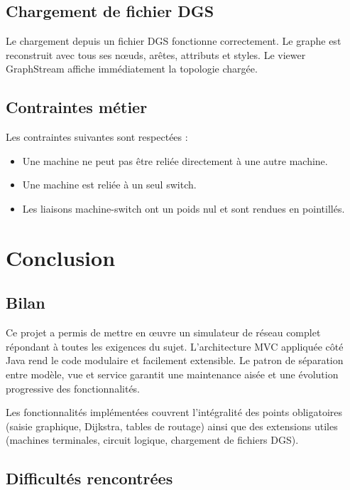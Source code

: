 \documentclass[12pt, a4paper]{article}
\begin{document}
\subsection{Chargement de fichier DGS}

Le chargement depuis un fichier DGS fonctionne correctement. Le graphe est reconstruit avec tous ses nœuds, arêtes, attributs et styles. Le viewer GraphStream affiche immédiatement la topologie chargée.

\subsection{Contraintes métier}

Les contraintes suivantes sont respectées :
\begin{itemize}
    \item Une machine ne peut pas être reliée directement à une autre machine.
    \item Une machine est reliée à un seul switch.
    \item Les liaisons machine-switch ont un poids nul et sont rendues en pointillés.
\end{itemize}

\section{Conclusion}

\subsection{Bilan}

Ce projet a permis de mettre en œuvre un simulateur de réseau complet répondant à toutes les exigences du sujet. L'architecture MVC appliquée côté Java rend le code modulaire et facilement extensible. Le patron de séparation entre modèle, vue et service garantit une maintenance aisée et une évolution progressive des fonctionnalités.

Les fonctionnalités implémentées couvrent l'intégralité des points obligatoires (saisie graphique, Dijkstra, tables de routage) ainsi que des extensions utiles (machines terminales, circuit logique, chargement de fichiers DGS).

\subsection{Difficultés rencontrées}
\end{document}
